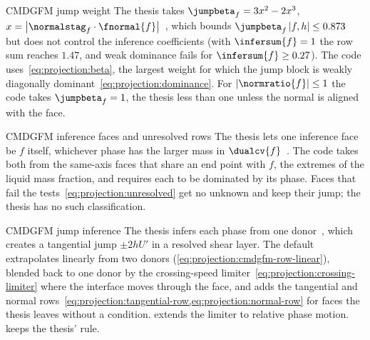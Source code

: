 

\begin{deviation}{CMDGFM jump weight}\label{dev:projection:beta}
The thesis takes
$\jumpbeta_f=3x^2-2x^3$, $x=\abs{\normalstag_f\cdot\fnormal{f}}$~,
which bounds $\jumpbeta_f\abs{\ratio{f,h}}\le0.873$ but does not control the
inference coefficients (with $\infersum{f}=1$ the row sum reaches $1.47$, and
weak dominance fails for $\infersum{f}\ge0.27$). The code
uses~\cref{eq:projection:beta}, the largest
weight for which the jump block is weakly diagonally
dominant~\cref{eq:projection:dominance}. For $\abs{\normratio{f}}\le1$ the
code takes $\jumpbeta_f=1$, the thesis less than one unless the normal is
aligned with the face.
\end{deviation}

\begin{deviation}{CMDGFM inference faces and unresolved rows}\label{dev:projection:inference}
The thesis lets one inference face be $f$ itself, whichever phase has the
larger mass in $\dualcv{f}$~. The code takes both from the
same-axis faces that share an end point with $f$, the extremes of the liquid
mass fraction, and requires each to be dominated by its phase. Faces that
fail the tests~\cref{eq:projection:unresolved} get no unknown and keep their
jump; the thesis has no such classification.
\end{deviation}

\begin{deviation}{CMDGFM jump inference}\label{dev:projection:jump-inference}
The thesis infers each phase from one donor~, which creates a
tangential jump $\pm2hU'$ in a resolved shear layer. The default
 extrapolates linearly from two donors
(\cref{eq:projection:cmdgfm-row-linear}), blended back to one donor by the
crossing-speed limiter~\cref{eq:projection:crossing-limiter} where the
interface moves through the face, and adds the tangential and normal
rows~\cref{eq:projection:tangential-row,eq:projection:normal-row} for faces
the thesis leaves without a condition. 
extends the limiter to relative phase motion. 
keeps the thesis' rule.
\end{deviation}

